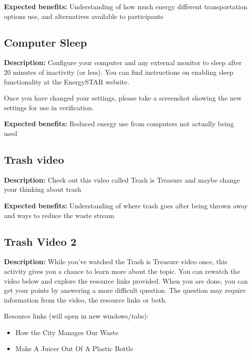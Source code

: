 \vspace{2ex}
\textbf{Expected benefits:} Understanding of how much energy different transportation options use, and alternatives available to participants


\subsection{Computer Sleep}

\textbf{Description:} Configure your computer and any external monitor to sleep after 20 minutes of inactivity (or less). You can find instructions on enabling sleep functionality at the EnergySTAR website.

Once you have changed your settings, please take a screenshot showing the new settings for use in verification.

\vspace{2ex}
\textbf{Expected benefits:} Reduced energy use from computers not actually being used


\subsection{Trash video}

\textbf{Description:} Check out this video called Trash is Treasure and maybe change your thinking about trash

\vspace{2ex}
\textbf{Expected benefits:} Understanding of where trash goes after being thrown away and ways to reduce the waste stream


\subsection{Trash Video 2}

\textbf{Description:} While you've watched the Trash is Treasure video once, this activity gives you a chance to learn more about the topic. You can rewatch the video below and explore the resource links provided. When you are done, you can get your points by answering a more difficult question. The question may require information from the video, the resource links or both.

Resource links (will open in new windows/tabs):

\begin{itemize}
	\item How the City Manages Our Waste
	\item Make A Juicer Out Of A Plastic Bottle
\end{itemize}

